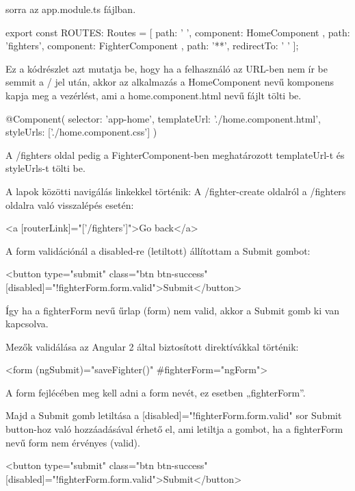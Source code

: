 sorra az app.module.ts fájlban.

\begin{cpp}
export const ROUTES: Routes = [
  { path: ' ', component: HomeComponent },
  { path: 'fighters', component: FighterComponent },
  { path: '**', redirectTo: ' ' }
];
\end{cpp}

Ez a kódrészlet azt mutatja be, hogy ha a felhasználó az URL-ben nem ír be semmit a / jel után, akkor az alkalmazás a HomeComponent nevű komponens kapja meg a vezérlést, ami a home.component.html nevű fájlt tölti be.

\begin{cpp}
@Component({
  selector: 'app-home',
  templateUrl: './home.component.html',
  styleUrls: ['./home.component.css']
})
\end{cpp}

A /fighters oldal pedig a FighterComponent-ben meghatározott templateUrl-t és styleUrls-t tölti be.

A lapok közötti navigálás linkekkel történik: 
A /fighter-create oldalról a /fighters oldalra való visszalépés esetén:

\begin{cpp}
<a [routerLink]="['/fighters']">Go back</a>
\end{cpp}


A form validációnál a disabled-re (letiltott) állítottam a Submit gombot:

\begin{cpp}
<button type="submit" class="btn btn-success" 
[disabled]="!fighterForm.form.valid">Submit</button>
\end{cpp}

Így ha a fighterForm nevű űrlap (form) nem valid, akkor a Submit gomb ki van kapcsolva.

Mezők validálása az Angular 2 által biztosított direktívákkal történik:

\begin{cpp}
<form (ngSubmit)="saveFighter()" #fighterForm="ngForm">
\end{cpp}

A form fejlécében meg kell adni a form nevét, ez esetben „fighterForm”.

Majd a Submit gomb letiltása a [disabled]="!fighterForm.form.valid" sor Submit button-hoz való hozzáadásával érhető el, ami letiltja a gombot, ha a fighterForm nevű form nem érvényes (valid).

\begin{cpp}
<button type="submit" class="btn btn-success" 
[disabled]="!fighterForm.form.valid">Submit</button>
\end{cpp}

